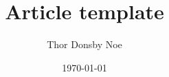 \usepackage{titling} %

\usepackage{authblk} %


\title{Article template}

\author{Thor Donsby Noe
}

\date{\today} %